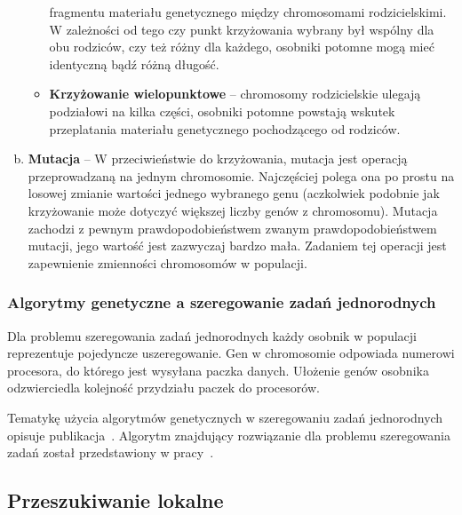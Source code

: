 \begin{enumerate}[a)]
\begin{itemize}
			fragmentu materiału genetycznego między chromosomami rodzicielskimi. W zależności od tego czy punkt krzyżowania wybrany był wspólny dla 
			obu rodziców, czy też różny dla każdego, osobniki potomne mogą mieć identyczną bądź różną długość.
			\item \textbf{Krzyżowanie wielopunktowe} -- chromosomy rodzicielskie ulegają podziałowi na kilka części, osobniki potomne powstają wskutek przeplatania 
			materiału genetycznego pochodzącego od rodziców.
		\end{itemize}
    \item \textbf{Mutacja} -- W przeciwieństwie do krzyżowania, mutacja jest operacją przeprowadzaną na jednym chromosomie. Najczęściej polega ona po prostu 
	na losowej zmianie wartości jednego wybranego genu (aczkolwiek podobnie jak krzyżowanie może dotyczyć większej liczby genów z chromosomu). Mutacja
	zachodzi z pewnym prawdopodobieństwem zwanym prawdopodobieństwem mutacji, jego wartość jest zazwyczaj bardzo mała. Zadaniem tej operacji 
	jest zapewnienie zmienności chromosomów w populacji.
\end{enumerate}

\subsubsection*{Algorytmy genetyczne a szeregowanie zadań jednorodnych}
Dla problemu szeregowania zadań jednorodnych każdy osobnik w populacji reprezentuje pojedyncze uszeregowanie. Gen w chromosomie odpowiada 
numerowi procesora, do którego jest wysyłana paczka danych. Ułożenie genów osobnika odzwierciedla kolejność przydziału paczek do procesorów.

Tematykę użycia algorytmów genetycznych w szeregowaniu zadań jednorodnych opisuje publikacja~\cite{div_ga1}. Algorytm znajdujący rozwiązanie dla 
problemu szeregowania zadań został przedstawiony w pracy~\cite{rogala}.

\subsection{Przeszukiwanie lokalne}

